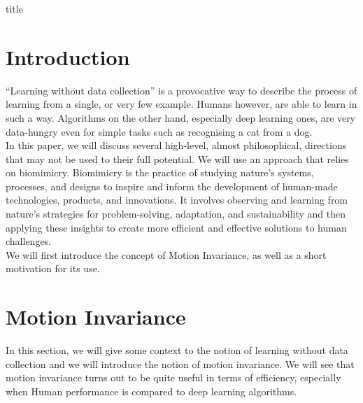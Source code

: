 \documentclass[12pt]{article}
\begin{document}
{title}

\tableofcontents




\section{Introduction}
``Learning without data collection'' is a provocative way to describe the process of learning from a single, or very few example. Humans however, are able to learn in such a way. Algorithms on the other hand, especially deep learning ones, are very data-hungry even for simple tasks such as recognising a cat from a dog. \\
In this paper, we will discuss several high-level, almost philosophical, directions that may not be used to their full potential. We will use an approach that relies on biomimicry. Biomimicry is the practice of studying nature's systems, processes, and designs to inspire and inform the development of human-made technologies, products, and innovations. It involves observing and learning from nature's strategies for problem-solving, adaptation, and sustainability and then applying these insights to create more efficient and effective solutions to human challenges. \\
We will first introduce the concept of Motion Invariance, as well as a short motivation for its use.

\section{Motion Invariance}
\label{sec: motion invariance}
In this section, we will give some context to the notion of learning without data collection and we will introduce the notion of motion invariance. We will see that motion invariance turns out to be quite useful in terms of efficiency, especially when Human performance is compared to deep learning algorithms.
\end{document}
